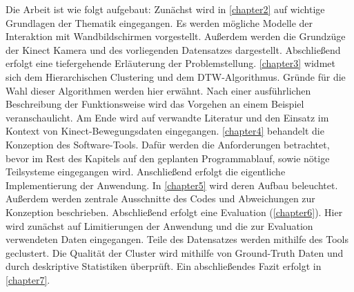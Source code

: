 Die Arbeit ist wie folgt aufgebaut:
Zunächst wird in \autoref{chapter2} auf wichtige Grundlagen der Thematik eingegangen.
Es werden mögliche Modelle der Interaktion mit Wandbildschirmen vorgestellt.
Außerdem werden die Grundzüge der Kinect Kamera und des vorliegenden Datensatzes dargestellt.
Abschließend erfolgt eine tiefergehende Erläuterung der Problemstellung.
\autoref{chapter3} widmet sich dem Hierarchischen Clustering und dem \ac*{DTW}-Algorithmus.
Gründe für die Wahl dieser Algorithmen werden hier erwähnt.
Nach einer ausführlichen Beschreibung der Funktionsweise
wird das Vorgehen an einem Beispiel veranschaulicht.
Am Ende wird auf verwandte Literatur
und den Einsatz im Kontext von Kinect-Bewegungsdaten eingegangen.
\autoref{chapter4} behandelt die Konzeption des Software-Tools.
Dafür werden die Anforderungen betrachtet,
bevor im Rest des Kapitels auf den geplanten Programmablauf,
sowie nötige Teilsysteme eingegangen wird.
Anschließend erfolgt die eigentliche Implementierung der Anwendung.
In \autoref{chapter5} wird deren Aufbau beleuchtet.
Außerdem werden zentrale Ausschnitte des Codes
und Abweichungen zur Konzeption beschrieben.
Abschließend erfolgt eine Evaluation (\autoref{chapter6}).
Hier wird zunächst auf Limitierungen der Anwendung
und die zur Evaluation verwendeten Daten eingegangen.
Teile des Datensatzes werden mithilfe des Tools geclustert.
Die Qualität der Cluster wird mithilfe von Ground-Truth Daten
und durch deskriptive Statistiken überprüft.
Ein abschließendes Fazit erfolgt in \autoref{chapter7}.